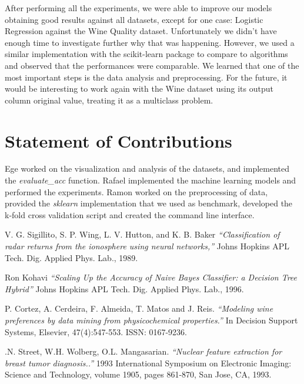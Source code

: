 \documentclass[conference]{IEEEtran}
\begin{document}
After performing all the experiments, we were able to improve our models obtaining good results against all datasets, except for one case: Logistic Regression against the Wine Quality dataset. Unfortunately we didn't have enough time to investigate further why that was happening. However, we used a similar implementation with the scikit-learn package to compare to algorithms and observed that the performances were comparable. We learned that one of the most important steps is the data analysis and preprocessing. For the future, it would be interesting to work again with the Wine dataset using its output column original value, treating it as a multiclass problem. 

\section{Statement of Contributions}
\label{section:contributions}

Ege worked on the visualization and analysis of the datasets, and implemented the \textit{evaluate\_acc} function. Rafael implemented the machine learning models and performed the experiments. Ramon worked on the preprocessing of data, provided the \textit{sklearn} implementation that we used as benchmark,  developed the k-fold cross validation script and created the command line interface.

\medskip

\small

\begin{thebibliography}{9}
V. G. Sigillito, S. P. Wing, L. V. Hutton, and K. B.
Baker 
\textit{ “Classification of radar returns from the
ionosphere using neural networks,”} 
 Johns Hopkins APL Tech. Dig. Applied Phys. Lab., 1989. 
 
Ron Kohavi
\textit{ “Scaling Up the Accuracy of Naive Bayes Classifier: a Decision Tree Hybrid”} 
 Johns Hopkins APL Tech. Dig. Applied Phys. Lab., 1996. 

 P. Cortez, A. Cerdeira, F. Almeida, T. Matos and J. Reis. 
\textit{ “Modeling wine preferences by data mining from physicochemical properties.”} 
In Decision Support Systems, Elsevier, 47(4):547-553. ISSN: 0167-9236.

 .N. Street, W.H. Wolberg, O.L. Mangasarian. 
\textit{ “Nuclear feature extraction for breast tumor diagnosis..”} 
 1993 International Symposium on Electronic Imaging: Science and Technology, volume 1905, pages 861-870, San Jose, CA, 1993.

\end{thebibliography}
\end{document}
